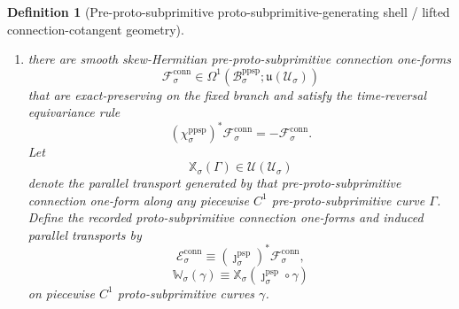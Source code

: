 \documentclass[11pt]{article}
\newcommand{\LieU}{\mathfrak u}
\newcommand{\RootClass}[1]{\mathscr U_{#1}}
\newcommand{\ProtoSubprimInc}[1]{\jmath_{#1}^{\mathrm{psp}}}
\newcommand{\ProtoSubprimLiouville}[1]{\boldsymbol{\Lambda}_{#1}^{\mathrm{psp}}}
\newcommand{\ProtoSubprimTwo}[1]{\boldsymbol{\Xi}_{#1}^{\mathrm{psp}}}
\newcommand{\ProtoSubprimConnectionForm}[1]{\mathcal E_{#1}^{\mathrm{conn}}}
\newcommand{\ProtoSubprimTransport}[1]{\mathbb W_{#1}}
\newcommand{\PreProtoSubprimSpace}[1]{\mathcal B_{#1}^{\mathrm{ppsp}}}
\newcommand{\PreProtoSubprimTimeRev}[1]{\chi_{#1}^{\mathrm{ppsp}}}
\newcommand{\PreProtoSubprimCotangentRealization}[1]{\widetilde{\Psi}_{#1}^{\mathrm{ppsp}}}
\newcommand{\PreProtoSubprimLiouville}[1]{\boldsymbol{\Lambda}_{#1}^{\mathrm{ppsp}}}
\newcommand{\PreProtoSubprimTwo}[1]{\boldsymbol{\Xi}_{#1}^{\mathrm{ppsp}}}
\newcommand{\PreProtoSubprimConnectionForm}[1]{\mathcal F_{#1}^{\mathrm{conn}}}
\newcommand{\PreProtoSubprimTransport}[1]{\mathbb X_{#1}}
\newtheorem{definition}{Definition}
\begin{document}
\begin{definition}[Pre-proto-subprimitive proto-subprimitive-generating shell / lifted connection-cotangent geometry]
\begin{enumerate}
\[    \]
    into the same recorded configuration spaces. Let \(\theta_{\mathrm{can}}\) denote the canonical Liouville one-form on the relevant cotangent bundle. Define pre-proto-subprimitive Liouville one-forms and closed two-forms by
    \begin{equation}
    \PreProtoSubprimLiouville{\sigma}\equiv (\PreProtoSubprimCotangentRealization{\sigma})^*\theta_{\mathrm{can}},
    \qquad
    \PreProtoSubprimTwo{\sigma}\equiv d\PreProtoSubprimLiouville{\sigma}.
    \label{eq:preprotosubprimitive_liouville}
    \end{equation}
    Assume
    \[
    (\PreProtoSubprimTimeRev{\sigma})^*\PreProtoSubprimLiouville{\sigma}
    =
    -\PreProtoSubprimLiouville{\sigma}.
    \]
    Define the recorded proto-subprimitive Liouville one-forms and closed two-forms by shell restriction:
    \begin{equation}
    \ProtoSubprimLiouville{\sigma}\equiv (\ProtoSubprimInc{\sigma})^*\PreProtoSubprimLiouville{\sigma},
    \qquad
    \ProtoSubprimTwo{\sigma}\equiv (\ProtoSubprimInc{\sigma})^*\PreProtoSubprimTwo{\sigma}.
    \label{eq:protosubprimitive_liouville_from_preprotosubprimitive}
    \end{equation}
    \item there are smooth skew-Hermitian pre-proto-subprimitive connection one-forms
    \[
    \PreProtoSubprimConnectionForm{\sigma}\in \Omega^1(\PreProtoSubprimSpace{\sigma};\LieU(\RootClass{\sigma}))
    \]
    that are exact-preserving on the fixed branch and satisfy the time-reversal equivariance rule
    \[
    (\PreProtoSubprimTimeRev{\sigma})^*\PreProtoSubprimConnectionForm{\sigma}
    =
    -\PreProtoSubprimConnectionForm{\sigma}.
    \]
    Let
    \[
    \PreProtoSubprimTransport{\sigma}(\Gamma)\in \mathcal U(\RootClass{\sigma})
    \]
    denote the parallel transport generated by that pre-proto-subprimitive connection one-form along any piecewise \(C^1\) pre-proto-subprimitive curve \(\Gamma\). Define the recorded proto-subprimitive connection one-forms and induced parallel transports by
    \begin{equation}
    \ProtoSubprimConnectionForm{\sigma}\equiv (\ProtoSubprimInc{\sigma})^*\PreProtoSubprimConnectionForm{\sigma},
    \label{eq:protosubprimitive_connection_from_preprotosubprimitive}
    \end{equation}
    \begin{equation}
    \ProtoSubprimTransport{\sigma}(\gamma)\equiv \PreProtoSubprimTransport{\sigma}(\ProtoSubprimInc{\sigma}\circ\gamma)
    \label{eq:protosubprimitive_transport_from_preprotosubprimitive}
    \end{equation}
    on piecewise \(C^1\) proto-subprimitive curves \(\gamma\).
\end{enumerate}


\end{definition}
\end{document}
